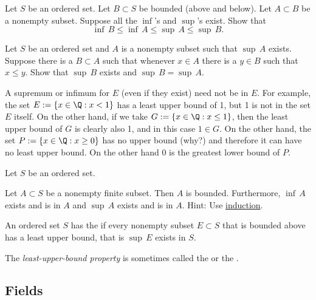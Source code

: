 \documentclass[12pt]{book}
\begin{document}
\begin{exercise}
Let $S$ be an ordered set.
Let $B \subset S$ be bounded (above and
below).
Let $A \subset B$ be a nonempty subset.
Suppose all the $\inf$'s and
$\sup$'s exist. Show that
\begin{equation*}
\inf\, B \leq \inf\, A \leq \sup\, A \leq \sup\, B .
\end{equation*}
\end{exercise}

\begin{exercise} \label{exercise:dominatingb}
Let $S$ be an ordered set and
$A$ is a nonempty subset such that $\sup \, A$ exists.
Suppose there
is a $B \subset A$ such that whenever $x \in A$ there is a $y \in B$
such that $x \leq y$.
Show that $\sup \, B$ exists and $\sup \, B = \sup \, A$.
\end{exercise}

A supremum or infimum for $E$ (even if they exist) need not be in $E$.
For example, the set $E := \{ x \in \Q : x < 1 \}$ has a least upper bound of 1, but 1 is not in the set $E$ itself.
On the other hand, if we take $G := \{ x \in \Q : x \leq 1 \}$, then the least upper bound of $G$ is clearly also 1, and in this case $1 \in G$.
On the other hand, the set $P := \{ x \in \Q : x \geq 0 \}$ has no upper bound (why?) and therefore it can have no least upper bound.
On the other hand 0 is the greatest lower bound of $P$.

\begin{exercise} \label{exercise:finitesethasminmax}
Let $S$ be an ordered set.

Let $A \subset S$ be a nonempty finite subset.
Then $A$ is bounded.  
Furthermore, $\inf\, A$ exists and is in $A$ and $\sup\, A$ exists and is in $A$.  
Hint: Use \hyperref[induction:thm]{induction}.
\end{exercise}

\begin{defn} \label{defn:lub}
An ordered set $S$ has the \emph{} if
every nonempty
subset $E \subset S$ that is bounded above has a least upper bound,
that is $\sup\, E$ exists in $S$.
\end{defn}

The \emph{least-upper-bound property}
is sometimes called the \emph{} or the
\emph{}.


\subsection*{Fields}
\end{document}
